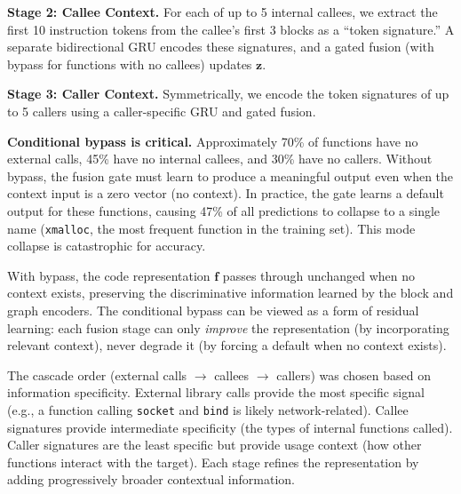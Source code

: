 \documentclass[sigconf,nonacm]{acmart}
\begin{document}
\textbf{Stage 2: Callee Context.} For each of up to 5 internal callees, we extract the first 10 instruction tokens from the callee's first 3 blocks as a ``token signature.'' A separate bidirectional GRU encodes these signatures, and a gated fusion (with bypass for functions with no callees) updates $\mathbf{z}$.

\textbf{Stage 3: Caller Context.} Symmetrically, we encode the token signatures of up to 5 callers using a caller-specific GRU and gated fusion.

\textbf{Conditional bypass is critical.} Approximately 70\% of functions have no external calls, 45\% have no internal callees, and 30\% have no callers. Without bypass, the fusion gate must learn to produce a meaningful output even when the context input is a zero vector (no context). In practice, the gate learns a default output for these functions, causing 47\% of all predictions to collapse to a single name (\texttt{xmalloc}, the most frequent function in the training set). This mode collapse is catastrophic for accuracy.

With bypass, the code representation $\mathbf{f}$ passes through unchanged when no context exists, preserving the discriminative information learned by the block and graph encoders. The conditional bypass can be viewed as a form of residual learning: each fusion stage can only \emph{improve} the representation (by incorporating relevant context), never degrade it (by forcing a default when no context exists).

The cascade order (external calls $\to$ callees $\to$ callers) was chosen based on information specificity. External library calls provide the most specific signal (e.g., a function calling \texttt{socket} and \texttt{bind} is likely network-related). Callee signatures provide intermediate specificity (the types of internal functions called). Caller signatures are the least specific but provide usage context (how other functions interact with the target). Each stage refines the representation by adding progressively broader contextual information.
\end{document}

